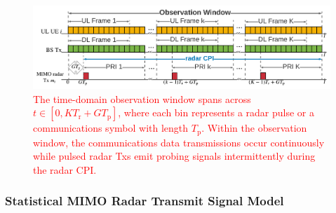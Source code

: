 \documentclass[10pt,journal]{IEEEtran}
\newcommand{\bracket}[1]{{\left [{#1}\right ]}}
\newcommand{\ith}[1]    {{#1}^{\underline{\text{th}}}}
\theoremstyle{definition}
\begin{document}
\begin{figure}[!t]
		\centering
		\includegraphics[width=1.0\columnwidth]{newFigures/Transmission.png}
		\caption{\textcolor{red}{The time-domain observation window spans across $t\in\bracket{0,KT_{\mathrm{r}}+GT_\mathrm{p}}$, where each bin represents a radar pulse or a communications symbol with length $T_{\mathrm{p}}$. Within the observation window, the communications data transmissions occur continuously while pulsed radar Txs emit probing signals intermittently during the radar CPI.}
		} 
		\label{fig:transmissionmodel}
	\end{figure} %
\subsubsection{Statistical MIMO Radar Transmit Signal Model}
\end{document}

